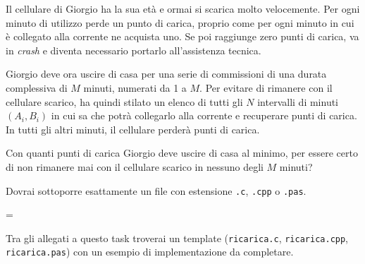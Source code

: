 \usepackage{xcolor}
\usepackage{afterpage}
\usepackage{pifont,mdframed}
\usepackage[bottom]{footmisc}

\makeatletter
\gdef\this@inputfilename{input.txt}
\gdef\this@outputfilename{output.txt}
\makeatother

\newcommand{\inputfile}{\texttt{input.txt}}
\newcommand{\outputfile}{\texttt{output.txt}}

\newenvironment{warning}
  {\par\begin{mdframed}[linewidth=2pt,linecolor=gray]%
    \begin{list}{}{\leftmargin=1cm
                   \labelwidth=\leftmargin}\item[\Large\ding{43}]}
  {\end{list}\end{mdframed}\par}

	Il cellulare di Giorgio ha la sua età e ormai si scarica molto velocemente. Per ogni minuto di utilizzo perde un punto di carica, proprio come per ogni minuto in cui è collegato alla corrente ne acquista uno. Se poi raggiunge zero punti di carica, va in \emph{crash} e diventa necessario portarlo all'assistenza tecnica.

	Giorgio deve ora uscire di casa per una serie di commissioni di una durata complessiva di $M$ minuti, numerati da 1 a $M$. Per evitare di rimanere con il cellulare scarico, ha quindi stilato un elenco di tutti gli $N$ intervalli di minuti $(A_i, B_i)$ in cui sa che potrà collegarlo alla corrente e recuperare punti di carica. In tutti gli altri minuti, il cellulare perderà punti di carica.

	Con quanti punti di carica Giorgio deve uscire di casa al minimo, per essere certo di non rimanere mai con il cellulare scarico in nessuno degli $M$ minuti?

\Implementation
Dovrai sottoporre esattamente un file con estensione \texttt{.c}, \texttt{.cpp} o \texttt{.pas}.

\begin{warning}
Tra gli allegati a questo task troverai un template (\texttt{ricarica.c}, \texttt{ricarica.cpp}, \texttt{ricarica.pas}) con un esempio di implementazione da completare.
\end{warning}

